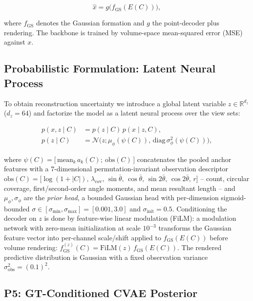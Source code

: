 \begin{equation}
    \hat{x} = g\big(f_{\mathrm{GS}}(E(C))\big),
    \label{eq:deterministic}
\end{equation}

where $f_{\mathrm{GS}}$ denotes the Gaussian formation and $g$ the
point-decoder plus rendering. The backbone is trained by
volume-space mean-squared error (MSE) against $x$.

\subsection{Probabilistic Formulation: Latent Neural Process}
\label{sec:method:prob}

To obtain reconstruction uncertainty we introduce a global latent
variable $z\in\mathbb{R}^{d_z}$ ($d_z=64$) and factorize the model as a
latent neural process \cite{garnelo2018neural,garnelo2018latent} over
the view sets:

\begin{align}
    p(x, z \mid C) &= p(z\mid C)\, p(x\mid z, C),
    \label{eq:joint}\\
    p(z\mid C) &= \mathcal{N}\big(z; \mu_\phi(\psi(C)),\,
        \mathrm{diag}\,\sigma_\phi^2(\psi(C))\big),
    \label{eq:prior}
\end{align}

where $\psi(C)=\big[\,\mathrm{mean}_{k}\, a_k(C);\ \mathrm{obs}(C)\,\big]$
concatenates the pooled anchor features with a 7-dimensional
permutation-invariant observation descriptor
$\mathrm{obs}(C)=\big[\log(1{+}|C|),\, \lambda_{\mathrm{cov}},\, \sin\bar\theta,
\,\cos\bar\theta,\, \sin 2\bar\theta,\, \cos 2\bar\theta,\, r\big]$ --
count, circular coverage, first/second-order angle moments, and mean
resultant length -- and $\mu_\phi,\sigma_\phi$ are the \emph{prior head},
a bounded Gaussian head with per-dimension sigmoid-bounded
$\sigma\in[\sigma_{\min},\sigma_{\max}]=[0.001,3.0]$ and
$\sigma_{\mathrm{init}}=0.5$. Conditioning the decoder on $z$ is done by
feature-wise linear modulation (FiLM): a modulation network with
zero-mean initialization at scale $10^{-3}$ transforms the Gaussian
feature vector into per-channel scale/shift applied to
$f_{\mathrm{GS}}(E(C))$ before volume rendering:
$f_{\mathrm{GS}}^{(z)}(C)=\mathrm{FiLM}(z)\,f_{\mathrm{GS}}(E(C))$. The
rendered predictive distribution is Gaussian with a fixed observation
variance $\sigma_{\mathrm{obs}}^2=(0.1)^2$.

\subsection{P5: GT-Conditioned CVAE Posterior}
\label{sec:method:p5}


